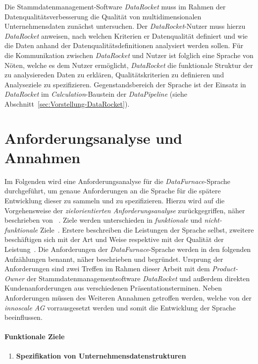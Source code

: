 \documentclass[
  language=german, %
  type=bachelor,%
  ngerman
]{isthesis}
\begin{document}
\begin{content}
  Die Stammdatenmanagement-Software \textit{DataRocket} muss im Rahmen der
  Datenqualitätsver\-besserung die Qualität von multidimensionalen
  Unternehmensdaten zunächst untersuchen. Der \textit{DataRocket}-Nutzer muss
  hierzu \textit{DataRocket} anweisen, nach welchen Kriterien er
  Datenqualität definiert und wie die Daten anhand der
  Datenqualitätsdefinitionen analysiert werden sollen. Für die Kommunikation
  zwischen \textit{DataRocket} und Nutzer ist folglich eine Sprache von Nöten,
  welche es dem Nutzer ermöglicht, \textit{DataRocket} die funktionale Struktur
  der zu analysiereden Daten zu erklären, Qualitätskriterien zu definieren und
  Analyseziele zu spezifizieren.  Gegenstandsbe\-reich der Sprache ist der
  Einsatz in \textit{DataRocket} im \textit{Calculation}-Baustein der
  \textit{DataPipeline} (siehe Abschnitt~\ref{sec:Vorstellung-DataRocket}).


  \section{Anforderungsanalyse und Annahmen}\label{sec:sprache/anforderungsanalyse}

  Im Folgenden wird eine Anforderungsanalyse für die
  \textit{DataFurnace}-Sprache durchgeführt, um genaue Anforderungen an die
  Sprache für die spätere Entwicklung dieser zu sammeln und zu spezifizieren.
  Hierzu wird auf die Vorgehensweise der \textit{zielorientierten
  Anforderungsanalyse} zurückgegriffen, näher beschrieben von
  \textsc{\citeauthor{van2001goal}}~\citeyearpar{van2001goal}.  Ziele werden
  unterschieden in \textit{funktionale} und \textit{nicht-funktionale}
  Ziele~\cite[][S.  36]{mylopoulos1999object}.  Erstere beschreiben die
  Leistungen der Sprache selbst, zweitere beschäftigen sich mit der Art und
  Weise respektive mit der Qualität der Leistung~\cite[][S.  250]{van2001goal}.
  Die Anforderungen der \textit{DataFurnace}-Sprache werden in den folgenden
  Aufzählungen benannt, näher beschrieben und begründet. Ursprung der
  Anforderungen sind zwei Treffen im Rahmen dieser Arbeit mit dem
  \textit{Product-Owner} der Stammdatenmanagementsoftware \textit{DataRocket}
  und außerdem direkten Kundenanforderungen aus verschiedenen
  Präsentationsterminen.  Neben Anforderungen müssen des Weiteren Annahmen
  getroffen werden, welche von der \textit{innoscale AG} vorrausgesetzt werden
  und somit die Entwicklung der Sprache beeinflussen.


  \paragraph{Funktionale Ziele}
    \begin{enumerate}
      \item \textbf{Spezifikation von Unternehmensdatenstrukturen}\label{item:spezifikation-von-unternehmensdatenstrukturen}


\end{enumerate}
\end{content}
\end{document}
